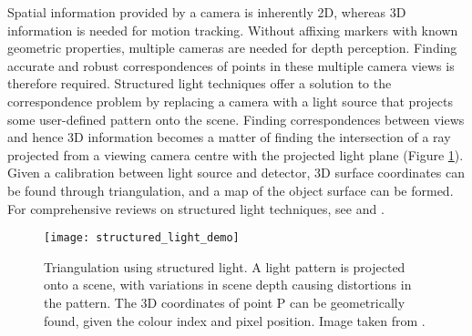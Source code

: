 \documentclass[class=article, crop=false]{standalone}
\begin{document}
Spatial information provided by a camera is inherently 2D, whereas 3D information is needed for motion tracking. Without affixing markers with known geometric properties, multiple cameras are needed for depth perception. Finding accurate and robust correspondences of points in these multiple camera views is therefore required. Structured light techniques offer a solution to the correspondence problem by replacing a camera with a light source that projects some user-defined pattern onto the scene. Finding correspondences between views and hence 3D information becomes a matter of finding the intersection of a ray projected from a viewing camera centre with the projected light plane (Figure \ref{struct_light}). Given a calibration between light source and detector, 3D surface coordinates can be found through triangulation, and a map of the object surface can be formed. For comprehensive reviews on structured light techniques, see \cite{Geng2011} and \cite{Salvi2010}.

\begin{figure}[!b]
	\centering
	\texttt{[image: structured\_light\_demo]}
	\caption{Triangulation using structured light. A light pattern is projected onto a scene, with variations in scene depth causing distortions in the pattern. The 3D coordinates of point P can be geometrically found, given the colour index and pixel position. Image taken from \parencite{Geng2011}.}\vspace*{-10pt}
	\label{struct_light}
\end{figure}
\end{document}
